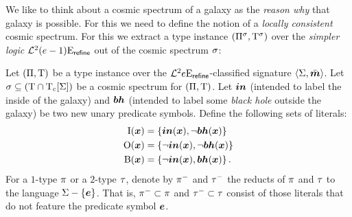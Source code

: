 We like to think about a cosmic spectrum of a galaxy as the \emph{reason why}
that galaxy is possible. For this we need to define the notion of a
\emph{locally consistent} cosmic spectrum. For this we extract a type instance
$(\Pi^{\sigma},\mathrm{T}^{\sigma})$ over the \emph{simpler logic}
$\mathcal{L}^{2}_{{}}{(e-1)}\mathrm{E}_{\mathsf{refine}}$ out of the cosmic spectrum $\sigma$:
\begin{definition}
Let $(\Pi,\mathrm{T})$ be a type instance over the
$\mathcal{L}^{2}_{{}}{e}\mathrm{E}_{\mathsf{refine}}$-classified signature $\left\langle \mathrm{\Sigma},\bar{\bm{m}} \right\rangle$.
Let $\sigma \subseteq (\mathrm{T} \cap \mathrm{T}_{\mathrm{c}}[\mathrm{\Sigma}])$ be a cosmic spectrum for
$(\Pi,\mathrm{T})$.
Let $\bm{in}$ (intended to label the inside of the galaxy) and $\bm{bh}$ (intended to
label some \emph{black hole} outside the galaxy) be two new unary predicate
symbols. Define the following sets of literals: 
\begin{align*}
  \mathrm{I}(\bm{x}) &= \left\{\bm{in}(\bm{x}),\lnot\bm{bh}(\bm{x})\right\} \\
  \mathrm{O}(\bm{x}) &= \left\{\lnot\bm{in}(\bm{x}), \lnot\bm{bh}(\bm{x})\right\} \\
  \mathrm{B}(\bm{x}) &= \left\{\lnot\bm{in}(\bm{x}), \bm{bh}(\bm{x})\right\}.
\end{align*}
For a $1$-type $\pi$ or a $2$-type $\tau$, denote by $\pi^{-}$ and $\tau^{-}$ the reducts of $\pi$ and
$\tau$ to the language $\mathrm{\Sigma} - \left\{\bm{e}\right\}$.
That is, $\pi^{-} \subset \pi$ and $\tau^{-} \subset \tau$ consist of
those literals that do not feature the predicate symbol $\bm{e}$.


\end{definition}
